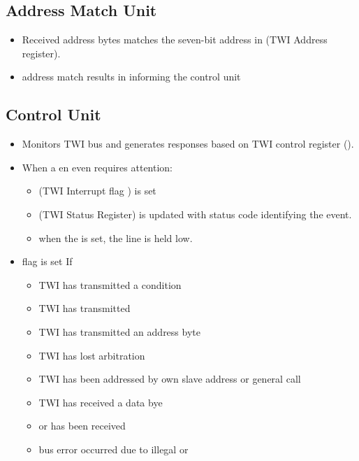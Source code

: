 \subsection{Address Match Unit}
\begin{itemize}
    \item Received address bytes matches the seven-bit address in  (TWI Address register).
    \item address match results in informing the control unit
\end{itemize}

\subsection{Control Unit}
\begin{itemize}
    \item Monitors TWI bus and generates responses based on TWI control register ().
    \item When a en even requires attention:
    \begin{itemize}
        \item {} (TWI Interrupt flag ) is set 
        \item {} (TWI Status Register) is updated with status code identifying the event.
        \item when the  is set, the  line is held low.
    \end{itemize}
    \item {} flag is set If
    \begin{itemize}
        \item TWI has transmitted a  condition
        \item TWI has transmitted 
        \item TWI has transmitted an address byte
        \item TWI has lost arbitration
        \item TWI has been addressed by own slave address or general call
        \item TWI has received a data bye
        \item {} or  has been received
        \item bus error occurred due to illegal  or 
    \end{itemize}
\end{itemize}

